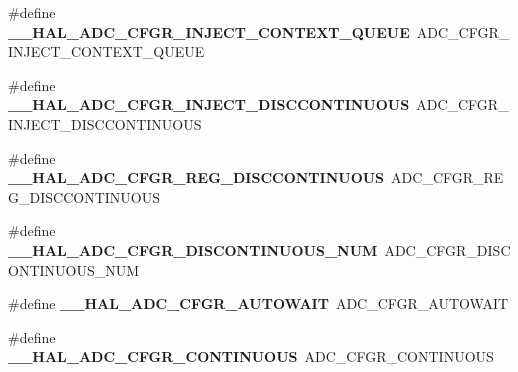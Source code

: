 \begin{DoxyCompactItemize}
\item 
\mbox{\label{group___h_a_l___a_d_c___aliased___macros_ga5010d7820f890534d6b6005438038ef5}} 
\#define {\bfseries \+\_\+\+\_\+\+H\+A\+L\+\_\+\+A\+D\+C\+\_\+\+C\+F\+G\+R\+\_\+\+I\+N\+J\+E\+C\+T\+\_\+\+C\+O\+N\+T\+E\+X\+T\+\_\+\+Q\+U\+E\+UE}~A\+D\+C\+\_\+\+C\+F\+G\+R\+\_\+\+I\+N\+J\+E\+C\+T\+\_\+\+C\+O\+N\+T\+E\+X\+T\+\_\+\+Q\+U\+E\+UE
\item 
\mbox{\label{group___h_a_l___a_d_c___aliased___macros_gaeaa692ac73b859de118c28bc0327cf77}} 
\#define {\bfseries \+\_\+\+\_\+\+H\+A\+L\+\_\+\+A\+D\+C\+\_\+\+C\+F\+G\+R\+\_\+\+I\+N\+J\+E\+C\+T\+\_\+\+D\+I\+S\+C\+C\+O\+N\+T\+I\+N\+U\+O\+US}~A\+D\+C\+\_\+\+C\+F\+G\+R\+\_\+\+I\+N\+J\+E\+C\+T\+\_\+\+D\+I\+S\+C\+C\+O\+N\+T\+I\+N\+U\+O\+US
\item 
\mbox{\label{group___h_a_l___a_d_c___aliased___macros_gad118cacc67e8c3f930008f5aa6d8dade}} 
\#define {\bfseries \+\_\+\+\_\+\+H\+A\+L\+\_\+\+A\+D\+C\+\_\+\+C\+F\+G\+R\+\_\+\+R\+E\+G\+\_\+\+D\+I\+S\+C\+C\+O\+N\+T\+I\+N\+U\+O\+US}~A\+D\+C\+\_\+\+C\+F\+G\+R\+\_\+\+R\+E\+G\+\_\+\+D\+I\+S\+C\+C\+O\+N\+T\+I\+N\+U\+O\+US
\item 
\mbox{\label{group___h_a_l___a_d_c___aliased___macros_ga6c152cf129addeff1a7f296fa89b04af}} 
\#define {\bfseries \+\_\+\+\_\+\+H\+A\+L\+\_\+\+A\+D\+C\+\_\+\+C\+F\+G\+R\+\_\+\+D\+I\+S\+C\+O\+N\+T\+I\+N\+U\+O\+U\+S\+\_\+\+N\+UM}~A\+D\+C\+\_\+\+C\+F\+G\+R\+\_\+\+D\+I\+S\+C\+O\+N\+T\+I\+N\+U\+O\+U\+S\+\_\+\+N\+UM
\item 
\mbox{\label{group___h_a_l___a_d_c___aliased___macros_ga2b6be3d51e5b71511f3db77d6781fc85}} 
\#define {\bfseries \+\_\+\+\_\+\+H\+A\+L\+\_\+\+A\+D\+C\+\_\+\+C\+F\+G\+R\+\_\+\+A\+U\+T\+O\+W\+A\+IT}~A\+D\+C\+\_\+\+C\+F\+G\+R\+\_\+\+A\+U\+T\+O\+W\+A\+IT
\item 
\mbox{\label{group___h_a_l___a_d_c___aliased___macros_gab45f96be007a67f1251d47410b5c9618}} 
\#define {\bfseries \+\_\+\+\_\+\+H\+A\+L\+\_\+\+A\+D\+C\+\_\+\+C\+F\+G\+R\+\_\+\+C\+O\+N\+T\+I\+N\+U\+O\+US}~A\+D\+C\+\_\+\+C\+F\+G\+R\+\_\+\+C\+O\+N\+T\+I\+N\+U\+O\+US

\end{DoxyCompactItemize}
